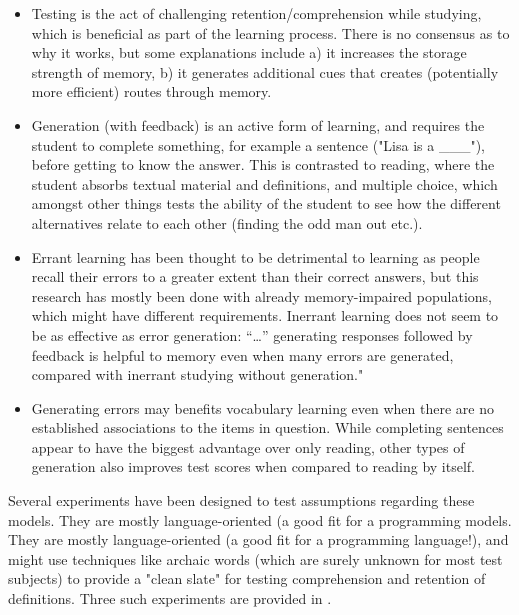 \begin{itemize}

\item Testing is the act of challenging retention/comprehension while studying,
  which is beneficial as part of the learning process. There is no consensus as
  to why it works, but some explanations include a) it increases the storage
  strength of memory, b) it generates additional cues that creates (potentially
  more efficient) routes through memory.\cite[p.6]{potts2014benefit}

\item Generation (with feedback) is an active form of learning, and requires the
  student to complete something, for example a sentence ("Lisa is a \_\_\_"),
  before getting to know the answer. This is contrasted to reading, where the
  student absorbs textual material and definitions, and multiple choice, which
  amongst other things tests the ability of the student to see how the different
  alternatives relate to each other (finding the odd man out etc.).

\item Errant learning has been thought to be detrimental to learning as people
  recall their errors to a greater extent than their correct
  answers\cite{potts2014benefit}, but this research has mostly been done with
  already memory-impaired populations, which might have different requirements.
  Inerrant learning does not seem to be as effective as error generation: 
  ``\dots'' generating responses followed by feedback is helpful to memory 
  even when many errors are generated, compared with inerrant studying without
  generation."\cite[p.54]{potts2014benefit}

\item Generating errors may benefits vocabulary learning even when there are 
  no established associations to the items in 
  question\cite[p.54]{potts2014benefit}. While completing sentences appear to 
  have the biggest advantage over only reading, other types of generation also 
  improves test scores when compared to reading by 
  itself\cite[p.73]{benassi2014applying}.

\end{itemize}

Several experiments have been designed to test assumptions regarding
these models. They are mostly language-oriented (a good fit for a programming
models. They are mostly language-oriented (a good fit for a programming
language!), and might use techniques like archaic words (which are surely
unknown for most test subjects) to provide a "clean slate" for testing
comprehension and retention of definitions. Three such experiments are provided
in \cite{potts2014benefit}.

